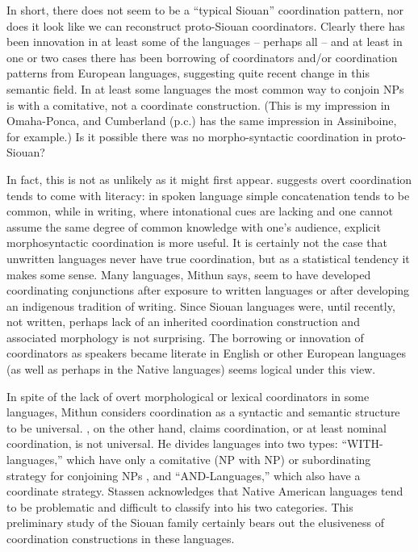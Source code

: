 \documentclass[output=paper]{LSP/langsci}
\begin{document}
In short, there does not seem to be a ``typical Siouan'' coordination pattern, nor does it look like we can reconstruct proto-Siouan coordinators. Clearly there has been innovation in at least some of the languages -- perhaps all -- and at least in one or two cases there has been borrowing of coordinators and/or coordination patterns from European languages, suggesting quite recent change in this semantic field. In at least some languages the most common way to conjoin NPs is with a comitative, not a coordinate construction. (This is my impression in Omaha-Ponca, and Cumberland (p.c.) has the same impression in Assiniboine, for example.) Is it possible there was no morpho-syntactic coordination in proto-Siouan?

In fact, this is not as unlikely as it might first appear. \citet{Mithun1988} suggests overt coordination tends to come with literacy: in spoken language simple concatenation tends to be common, while in writing, where intonational cues are lacking and one cannot assume the same degree of common knowledge with one's audience, explicit morphosyntactic coordination is more useful. It is certainly not the case that unwritten languages never have true coordination, but as a statistical tendency it makes some sense. Many languages, Mithun says, seem to have developed coordinating conjunctions after exposure to written languages or after developing an indigenous tradition of writing. Since Siouan languages were, until recently, not written, perhaps lack of an inherited coordination construction and associated morphology is not surprising. The borrowing or innovation of coordinators as speakers became literate in English or other European languages (as well as perhaps in the Native languages) seems logical under this view.

In spite of the lack of overt morphological or lexical coordinators in some languages, Mithun considers coordination as a syntactic and semantic structure to be universal. \citet{Stassen2000}, on the other hand, claims coordination, or at least nominal coordination, is not universal. He divides languages into two types: ``WITH-languages,'' which have only a comitative (NP with NP) or subordinating strategy for conjoining NPs , and ``AND-Languages,'' which also have a coordinate strategy. Stassen acknowledges that Native American languages tend to be problematic and difficult to classify into his two categories. This preliminary study of the Siouan family certainly bears out the elusiveness of coordination constructions in these languages.
\end{document}
